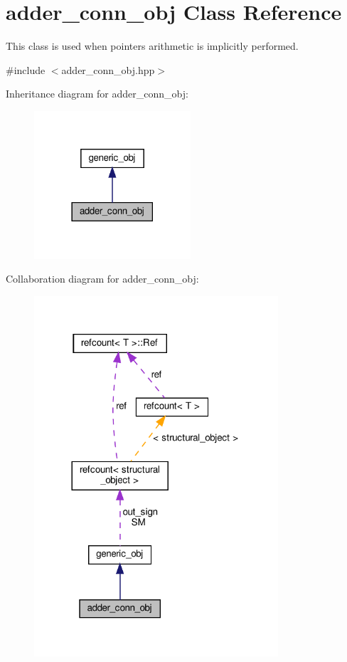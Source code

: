 \hypertarget{classadder__conn__obj}{}\section{adder\+\_\+conn\+\_\+obj Class Reference}
\label{classadder__conn__obj}


This class is used when pointers arithmetic is implicitly performed.  




{\ttfamily \#include $<$adder\+\_\+conn\+\_\+obj.\+hpp$>$}



Inheritance diagram for adder\+\_\+conn\+\_\+obj\+:
\nopagebreak
\begin{figure}[H]
\begin{center}
\leavevmode
\includegraphics[width=165pt]{d0/d02/classadder__conn__obj__inherit__graph}
\end{center}
\end{figure}


Collaboration diagram for adder\+\_\+conn\+\_\+obj\+:
\nopagebreak
\begin{figure}[H]
\begin{center}
\leavevmode
\includegraphics[width=257pt]{d8/d24/classadder__conn__obj__coll__graph}
\end{center}
\end{figure}
